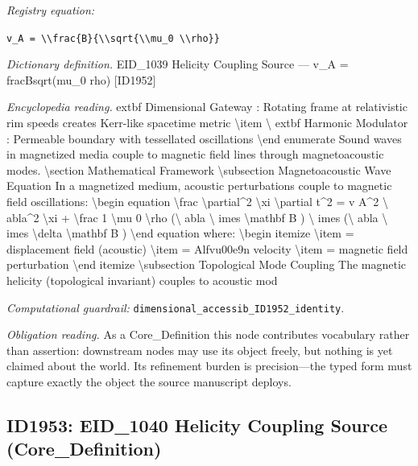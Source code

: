 \documentclass[11pt]{article}
\theoremstyle{remark}
\begin{document}
\noindent\textit{Registry equation:}\par
{\small\texttt{v\_A = \textbackslash{}\textbackslash{}frac\{B\}\{\textbackslash{}\textbackslash{}sqrt\{\textbackslash{}\textbackslash{}mu\_0 \textbackslash{}\textbackslash{}rho\}\}}}\par\medskip
\noindent\textit{Dictionary definition.} EID\_1039 Helicity Coupling Source --- v\_A = fracBsqrt(mu\_0 rho) [ID1952]\par\medskip
\noindent\textit{Encyclopedia reading.} extbf Dimensional Gateway : Rotating frame at relativistic rim speeds creates Kerr-like spacetime metric \textbackslash{}item \textbackslash{} extbf Harmonic Modulator : Permeable boundary with tessellated oscillations \textbackslash{}end enumerate Sound waves in magnetized media couple to magnetic field lines through magnetoacoustic modes. \textbackslash{}section Mathematical Framework \textbackslash{}subsection Magnetoacoustic Wave Equation In a magnetized medium, acoustic perturbations couple to magnetic field oscillations: \textbackslash{}begin equation \textbackslash{}frac \textbackslash{}partial\textasciicircum{}2 \textbackslash{}xi \textbackslash{}partial t\textasciicircum{}2 = v A\textasciicircum{}2 \textbackslash{} abla\textasciicircum{}2 \textbackslash{}xi + \textbackslash{}frac 1 \textbackslash{}mu 0 \textbackslash{}rho (\textbackslash{} abla \textbackslash{} imes \textbackslash{}mathbf B ) \textbackslash{} imes (\textbackslash{} abla \textbackslash{} imes \textbackslash{}delta \textbackslash{}mathbf B ) \textbackslash{}end equation where: \textbackslash{}begin itemize \textbackslash{}item = displacement field (acoustic) \textbackslash{}item = Alfvu00e9n velocity \textbackslash{}item = magnetic field perturbation \textbackslash{}end itemize \textbackslash{}subsection Topological Mode Coupling The magnetic helicity (topological invariant) couples to acoustic mod
\par\medskip\noindent\textit{Computational guardrail:} \texttt{dimensional\_accessib\_ID1952\_identity}.
\par\medskip\noindent\textit{Obligation reading.} As a Core\_Definition this node contributes vocabulary rather than assertion: downstream nodes may use its object freely, but nothing is yet claimed about the world. Its refinement burden is precision---the typed form must capture exactly the object the source manuscript deploys.

\subsection{ID1953: EID\_1040 Helicity Coupling Source (Core\_Definition)}
\end{document}
